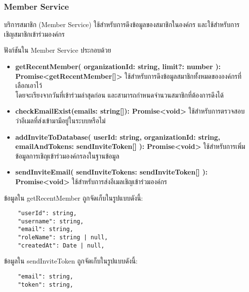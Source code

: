 \subsubsection{Member Service}

\ifenglish
\else
บริการสมาชิก (Member Service) ใช้สำหรับการดึงข้อมูลของสมาชิกในองค์กร และใช้สำหรับการเชิญสมาชิกเข้าร่วมองค์กร

ฟังก์ชันใน Member Service ประกอบด้วย

\begin{itemize}
    \item \textbf{getRecentMember(
        organizationId: string,
        limit?: number
      ): \\Promise<getRecentMember[]>} ใช้สำหรับการดึงข้อมูลสมาชิกทั้งหมดขององค์กรที่เลือกเอาไว้ \\โดยจะเรียงจากวันที่เข้าร่วมล่าสุดก่อน และสามารถกำหนดจำนวนสมาชิกที่ต้องการดึงได้
    \item \textbf{checkEmailExist(emails: string[]): Promise<void>} ใช้สำหรับการตรวจสอบว่าอีเมลที่ส่งเข้ามามีอยู่ในระบบหรือไม่
    \item \textbf{addInviteToDatabase(
        userId: string,
        organizationId: string,
        emailAndTokens: sendInviteToken[]
      ): Promise<void>} ใช้สำหรับการเพิ่มข้อมูลการเชิญเข้าร่วมองค์กรลงในฐานข้อมูล
    \item \textbf{sendInviteEmail(
        sendInviteTokens: sendInviteToken[]
      ): Promise<void>} ใช้สำหรับการส่งอีเมลเชิญเข้าร่วมองค์กร
\end{itemize}

ข้อมูลใน getRecentMember ถูกจัดเก็บในรูปแบบดังนี้:
\begin{lstlisting}
    "userId": string,
    "username": string,
    "email": string,
    "roleName": string | null,
    "createdAt": Date | null,
\end{lstlisting}

ข้อมูลใน sendInviteToken ถูกจัดเก็บในรูปแบบดังนี้:
\begin{lstlisting}
    "email": string,
    "token": string,
\end{lstlisting}
\fi

\clearpage
